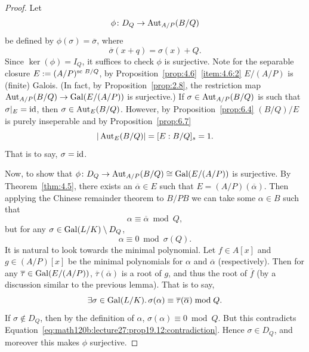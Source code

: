 \begin{proof}
Let 
\begin{equation}
\phi\colon D_{Q}\to\operatorname{Aut}_{A/P}(B/Q)
\end{equation}
be defined by $\phi(\sigma)=\overline{\sigma}$, where
\begin{equation}
\overline{\sigma}(x+q)=\sigma(x)+Q.
\end{equation}
Since $\ker(\phi)=I_{Q}$, it suffices to check $\phi$ is
surjective. Note for the separable closure $E:=\separableclosure{(A/P)}{B/Q}$,
by Proposition~\ref{prop:4.6}~\ref{item:4.6:2} $E/(A/P)$ is (finite) Galois.
(In fact, by Proposition~\ref{prop:2.8}, the restriction map
$\operatorname{Aut}_{A/P}(B/Q)\to\operatorname{Gal}(E/(A/P))$ is surjective.) If
$\sigma\in\operatorname{Aut}_{A/P}(B/Q)$ is such that $\sigma|_{E}=\operatorname{id}$, then
$\sigma\in\operatorname{Aut}_{E}(B/Q)$. However, by Proposition~\ref{prop:6.4}
$(B/Q)/E$ is purely inseperable and by Proposition~\ref{prop:6.7}
\begin{equation}
|\operatorname{Aut}_{E}(B/Q)|=[E:B/Q]_{s}=1.
\end{equation}
That is to say, $\sigma=\operatorname{id}$.

Now, to show that $\phi\colon D_{Q}\to\operatorname{Aut}_{A/P}(B/Q)\cong\operatorname{Gal}(E/(A/P))$
is surjective. By Theorem~\ref{thm:4.5}, there exists an
$\overline{\alpha}\in E$ such that $E=(A/P)(\overline{\alpha})$. Then
applying the Chinese remainder theorem to $B/PB$ we can take some
$\alpha\in B$ such that
\begin{equation}
\alpha\equiv\overline{\alpha}\bmod{Q},
\end{equation}
but for any $\sigma\in\operatorname{Gal}(L/K)\setminus D_{Q}$,
\begin{equation}
\alpha\equiv0\bmod{\sigma(Q)}.
\end{equation}
It is natural to look towards the minimal polynomial. Let $f\in A[x]$
and $g\in(A/P)[x]$ be the minimal polynomials for $\alpha$ and
$\overline{\alpha}$ (respectively). Then for any
$\overline{\tau}\in\operatorname{Gal}(E/(A/P))$,
$\overline{\tau}(\overline{\alpha})$ is a root of $g$, and thus the
root of $\overline{f}$ (by a discussion similar to the previous lemma).
That is to say,
\begin{equation}\label{eq:math120b:lecture27:prop19.12:contradiction}
\exists\sigma\in\operatorname{Gal}(L/K)\ldotp\sigma(\alpha)\equiv\overline{\tau}(\overline{\alpha})\bmod{Q}.
\end{equation}
If $\sigma\notin D_{Q}$, then by the definition of $\alpha$,
$\sigma(\alpha)\equiv0\bmod{Q}$. But this contradicts
Equation~\eqref{eq:math120b:lecture27:prop19.12:contradiction}. Hence
$\sigma\in D_{Q}$,
and moreover this makes $\phi$ surjective.
\end{proof}

